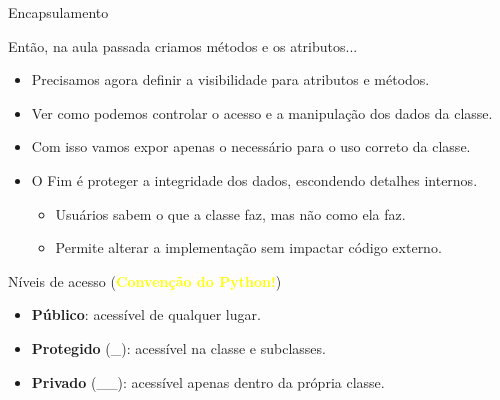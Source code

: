 \begin{frame}{Encapsulamento}

\begin{block}{Então, na aula passada criamos métodos e os atributos...}
\begin{itemize}
    \item Precisamos agora definir a visibilidade para atributos e métodos.
    \item Ver como podemos controlar o acesso e a manipulação dos dados da classe.

    \item Com isso vamos expor apenas o necessário para o uso correto da classe.

        \item O Fim é proteger a integridade dos dados, escondendo detalhes internos.
        \begin{itemize}
          \item Usuários sabem o que a classe faz, mas não como ela faz.
    \item Permite alterar a implementação sem impactar código externo.
        \end{itemize}
\end{itemize}
\end{block}



\begin{block}{Níveis de acesso (\textcolor{yellow}{\textbf{Convenção do Python!}})}
\begin{itemize}
    \item \textbf{Público}: acessível de qualquer lugar.
    \item \textbf{Protegido} (\_): acessível na classe e subclasses.
    \item \textbf{Privado} (\_\_): acessível apenas dentro da própria classe.

\end{itemize}
\end{block}

\end{frame}

